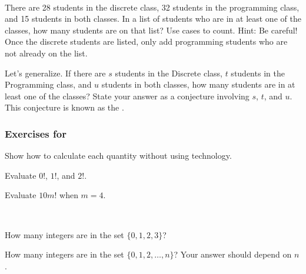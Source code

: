 \begin{exer} [\exerE] %
    \label{exer_inclusion_exclusion_2sets}
    ~
    \begin{exerpart}
        \item There are 28 students in the discrete class, 32 students in the programming class, and 15 students in both classes. In a list of students who are in at least one of the classes, how many students are on that list?  Use cases to count.  Hint: Be careful! Once the discrete students are listed, only add programming students who are not already on the list.
        \item Let's generalize.  If there are $s$ students in the Discrete class, $t$ students in the Programming class, and $u$ students in both classes, how many students are in at least one of the classes?  State your answer as a conjecture involving $s$, $t$, and $u$.  This conjecture is known as the .
    \end{exerpart}
\end{exer}


\subsubsection*{Exercises for  \subfactorials}

\begin{exer} [\exerP] %
\label{exer_evaluate_factorials}
    Show how to calculate each quantity without using technology.
    \begin{exerpart}
        \item Evaluate $0!$, $1!$, and $2!$.
        \item Evaluate $10m!$ when $m=4$.
    \end{exerpart}
\end{exer}

\begin{exer}[\exerP] %
\label{exer_set1ton}
~
    \begin{exerpart}
        \item How many integers are in the set $\{0,1,2,3\}$?
        \item How many integers are in the set $\{0,1,2,\ldots,n\}$?  Your answer should depend on $n$.
    \end{exerpart}
\end{exer}

